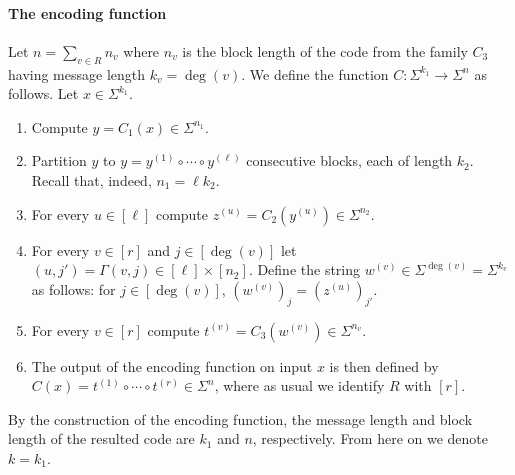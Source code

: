 \documentclass[10pt,a4paper]{article}
\begin{document}
\paragraph{The encoding function}
Let $n=\sum_{v\in R}n_v$ where $n_v$ is the block length of the code from the family $C_3$ having message length $k_v=\deg(v)$. We define the function $C:\Sigma^{k_1}\to\Sigma^n$ as follows. Let $x\in\Sigma^{k_1}$.
\begin{enumerate}
\item Compute $y=C_1(x)\in\Sigma^{n_1}$.
\item Partition $y$ to $y=y^{(1)}\circ\cdots\circ y^{(\ell)}$ consecutive blocks, each of length $k_2$. Recall that, indeed, $n_1=\ell k_2$.
\item For every $u\in[\ell]$ compute $z^{(u)}=C_2(y^{(u)})\in\Sigma^{n_2}$.
\item For every $v\in[r]$ and $j\in[\deg(v)]$ let $(u,j')=\Gamma(v,j)\in[\ell]\times[n_2]$. Define the string $w^{(v)}\in\Sigma^{\deg(v)}=\Sigma^{k_v}$ as follows: for $j\in[\deg(v)]$, $(w^{(v)})_j=(z^{(u)})_{j'}$.
\item For every $v\in[r]$ compute $t^{(v)}=C_3(w^{(v)})\in\Sigma^{n_v}$.
\item The output of the encoding function on input $x$ is then defined by $C(x)=t^{(1)}\circ\cdots\circ t^{(r)}\in\Sigma^n$, where as usual we identify $R$ with $[r]$.
\end{enumerate}
By the construction of the encoding function, the message length and block length of the resulted code are $k_1$ and $n$, respectively. From here on we denote $k=k_1$.
\end{document}
